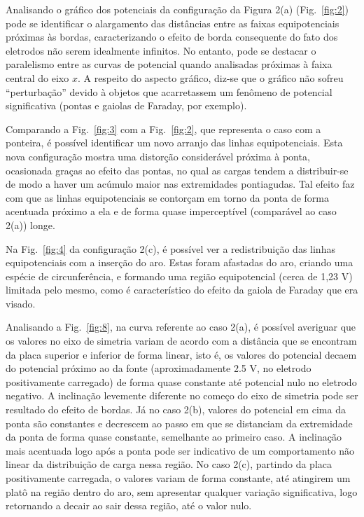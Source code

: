 Analisando o gráfico dos potenciais da configuração da Figura 2(a) (Fig.~\ref{fig:2}) pode se identificar o alargamento das distâncias entre as faixas equipotenciais próximas às bordas, caracterizando o efeito de borda consequente do fato dos eletrodos não serem idealmente infinitos. No entanto, pode se destacar o paralelismo entre as curvas de potencial quando analisadas próximas à faixa central do eixo $x$. A respeito do aspecto gráfico, diz-se que o gráfico não sofreu “perturbação” devido à objetos que acarretassem um fenômeno de potencial significativa (pontas e gaiolas de Faraday, por exemplo).

Comparando a Fig.~\ref{fig:3} com a Fig.~\ref{fig:2}, que representa o caso com a  ponteira, é possível identificar um novo arranjo das linhas equipotenciais. Esta nova  configuração mostra uma distorção considerável próxima à ponta, ocasionada graças ao efeito das pontas, no qual as cargas tendem a distribuir-se de modo a haver um acúmulo maior nas extremidades pontiagudas. Tal efeito faz com que as linhas equipotenciais se contorçam em torno da ponta de forma acentuada próximo a ela e de forma quase imperceptível (comparável ao caso 2(a)) longe. 

Na Fig.~\ref{fig:4} da configuração 2(c), é possível ver a redistribuição das linhas equipotenciais com a inserção do aro. Estas foram afastadas do aro, criando uma espécie de circunferência, e formando uma região equipotencial (cerca de 1,23 V) limitada pelo mesmo, como é característico do efeito da gaiola de Faraday que era visado.

Analisando a Fig.~\ref{fig:8}, na curva referente ao caso 2(a), é possível averiguar que os valores no eixo de simetria variam de acordo com a distância que se encontram da placa superior e inferior de forma linear, isto é, os valores do potencial decaem do potencial próximo ao da fonte (aproximadamente 2.5 V, no eletrodo positivamente carregado) de forma quase constante até potencial nulo no eletrodo negativo. A inclinação levemente diferente no começo do eixo de simetria pode ser resultado do efeito de bordas. Já no caso 2(b), valores do potencial em cima da ponta são constantes e decrescem ao passo em que se distanciam da extremidade da ponta de forma quase constante, semelhante ao primeiro caso. A inclinação mais acentuada logo após a ponta pode ser indicativo de um comportamento não linear da distribuição de carga nessa região. No caso 2(c), partindo da placa positivamente carregada, o valores variam de forma constante, até atingirem um platô na região dentro do aro, sem apresentar qualquer variação significativa, logo retornando a decair ao sair dessa região, até o valor nulo.